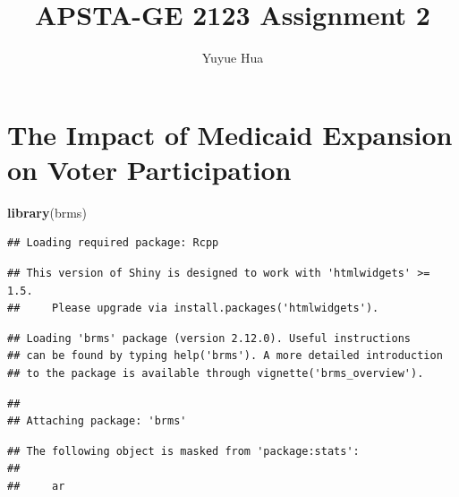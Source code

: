 \documentclass[]{article}
\title{APSTA-GE 2123 Assignment 2}
\author{Yuyue Hua}
\date{}
\newenvironment{Shaded}{\begin{snugshade}}{\end{snugshade}}
\newcommand{\CommentTok}[1]{\textcolor[rgb]{0.56,0.35,0.01}{\textit{#1}}}
\newcommand{\KeywordTok}[1]{\textcolor[rgb]{0.13,0.29,0.53}{\textbf{#1}}}
\newcommand{\NormalTok}[1]{#1}
\newcommand{\StringTok}[1]{\textcolor[rgb]{0.31,0.60,0.02}{#1}}
\begin{document}
\maketitle

\hypertarget{the-impact-of-medicaid-expansion-on-voter-participation}{%
\section{The Impact of Medicaid Expansion on Voter
Participation}\label{the-impact-of-medicaid-expansion-on-voter-participation}}

\begin{Shaded}
\begin{Highlighting}[]
\KeywordTok{library}\NormalTok{(brms)}
\end{Highlighting}
\end{Shaded}

\begin{verbatim}
## Loading required package: Rcpp
\end{verbatim}

\begin{verbatim}
## This version of Shiny is designed to work with 'htmlwidgets' >= 1.5.
##     Please upgrade via install.packages('htmlwidgets').
\end{verbatim}

\begin{verbatim}
## Loading 'brms' package (version 2.12.0). Useful instructions
## can be found by typing help('brms'). A more detailed introduction
## to the package is available through vignette('brms_overview').
\end{verbatim}

\begin{verbatim}
## 
## Attaching package: 'brms'
\end{verbatim}

\begin{verbatim}
## The following object is masked from 'package:stats':
## 
##     ar
\end{verbatim}

\begin{Shaded}
\end{Shaded}
\end{document}
